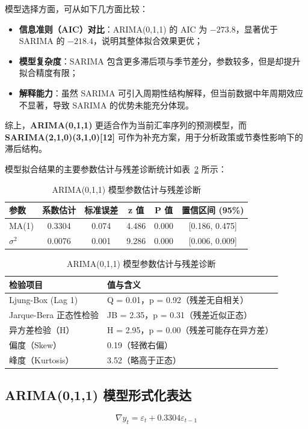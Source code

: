 \documentclass[11pt,a4paper]{article}
\begin{document}
模型选择方面，可从如下几方面比较：

\begin{itemize}
  \item \textbf{信息准则（AIC）对比}：ARIMA(0,1,1) 的 AIC 为 $-273.8$，显著优于 SARIMA 的 $-218.4$，说明其整体拟合效果更优；
  \item \textbf{模型复杂度}：SARIMA 包含更多滞后项与季节差分，参数较多，但是却提升拟合精度有限；
  \item \textbf{解释能力}：虽然 SARIMA 可引入周期性结构解释，但当前数据中年周期效应不显著，导致 SARIMA 的优势未能充分体现。
\end{itemize}

综上，\textbf{ARIMA(0,1,1)} 更适合作为当前汇率序列的预测模型，而 \textbf{SARIMA(2,1,0)(3,1,0)[12]} 可作为补充方案，用于分析政策或节奏性影响下的滞后结构。

模型拟合结果的主要参数估计与残差诊断统计如表~\ref{tab:arima-summary} 所示：

\begin{table}[H]
\centering
\caption{ARIMA(0,1,1) 模型参数估计与残差诊断}
\label{tab:arima-summary}
\begin{tabular}{lccccc}
\toprule
参数 & 系数估计 & 标准误差 & z 值 & P 值 & 置信区间 (95\%) \\
\midrule
MA(1) & 0.3304 & 0.074 & 4.486 & 0.000 & [0.186, 0.475] \\
$\sigma^2$ & 0.0076 & 0.001 & 9.286 & 0.000 & [0.006, 0.009] \\
\bottomrule
\end{tabular}

\vspace{1em}
\begin{tabular}{ll}
\toprule
检验项目 & 值与含义 \\
\midrule
Ljung-Box (Lag 1) & Q = 0.01，p = 0.92（残差无自相关） \\
Jarque-Bera 正态性检验 & JB = 2.35，p = 0.31（残差近似正态） \\
异方差检验（H） & H = 2.95，p = 0.00（残差可能存在异方差） \\
偏度（Skew） & 0.19（轻微右偏） \\
峰度（Kurtosis） & 3.52（略高于正态） \\
\bottomrule
\end{tabular}
\end{table}
\subsection*{ARIMA(0,1,1) 模型形式化表达}
\[
\nabla y_t = \varepsilon_t + 0.3304 \varepsilon_{t-1}
\]
\end{document}

